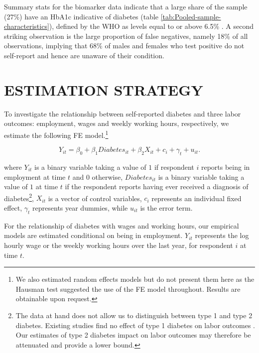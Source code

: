 \documentclass[12pt,english]{article}
\begin{document}
Summary stats for the biomarker data indicate that a large share of the sample (27\%) have an \ac{HbA1c} indicative of diabetes (table \ref{tab:Pooled-sample-characteristics}), defined by the \ac{WHO} as levels equal to or above 6.5\% \parencite{WorldHealthOrganization2011}. A second striking observation is the large proportion of false negatives, namely 18\% of all observations, implying that 68\% of males and females who test positive do not self-report and hence are unaware of their condition.





\section{\label{sec:Estimation Strategy}ESTIMATION STRATEGY}

To investigate the relationship between self-reported diabetes and three labor outcomes: employment, wages and weekly working hours, respectively, we estimate the following \acf{FE} model.\footnote{We also estimated random effects models but do not present them here as the Hausman test suggested the use of the FE model throughout. Results are obtainable upon request.}


\begin{equation}
Y_{it}=\beta_{0}+\beta_{1}Diabetes_{it}+\beta_{2}X_{it}+c_{i}+\gamma_{t}+u_{it}.\label{eq:cha4_employed}
\end{equation}


where $Y_{it}$ is a binary variable taking a value of $1$ if respondent $i$ reports being in employment at time $t$ and $0$ otherwise, $Diabetes_{it}$ is a binary variable taking a value of $1$ at time $t$ if the respondent reports having ever received a diagnosis of diabetes\footnote{The data at hand does not allow us to distinguish between type 1 and type 2 diabetes. Existing studies find no effect of type 1 diabetes on labor outcomes  \parencite{Minor2011,Minor2015}. Our estimates of type 2 diabetes impact on labor outcomes may therefore be attenuated and provide a lower bound.}, $X_{it}$ is a vector of control variables, $c_{i}$ represents an individual fixed effect, $\gamma_{t}$ represents year dummies, while $u_{it}$ is the error term.

For the relationship of diabetes with wages and working hours, our empirical models are estimated conditional on being in employment. $Y_{it}$ represents the log hourly wage or the weekly working hours over the last year, for respondent $i$ at time $t$.
\end{document}
